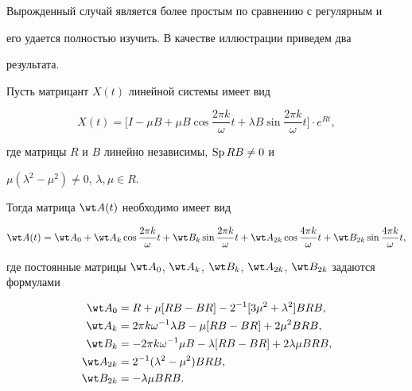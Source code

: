  


Вырожденный случай является более простым по сравнению с регулярным и 


его удается полностью изучить. В качестве иллюстрации приведем два 


результата. 


 


 


\begin{thm} 


Пусть матрицант $X(t)$ линейной системы имеет вид 


$$ 


X(t)=\bigg[I-\mu B+\mu B\cos\frac{2\pi k}{\omega}t+ 


\lambda B\sin\frac{2\pi k}{\omega}t\bigg]\cdot e^{Rt}, 


$$ 


где матрицы $R$ и $B$ линейно независимы, $\operatorname{Sp} RB\ne0$ и 


$\mu(\lambda^2-\mu^2)\ne0$, $\lambda,\mu\in R$. 


Тогда матрица $\wt A(t)$ необходимо имеет вид 


$$ 


\wt A(t)=\wt A_0+\wt A_k\cos\frac{2\pi k}{\omega}t+ 


\wt B_k\sin\frac{2\pi k}{\omega}t+ 


\wt A_{2k}\cos\frac{4\pi k}{\omega}t+\wt B_{2k} 


\sin\frac{4\pi k}{\omega}t, 


$$ 


где постоянные матрицы $\wt A_0$, $\wt A_k$, $\wt B_k$, $\wt A_{2k}$, $\wt 


B_{2k}$ задаются формулами 


\begin{align*} 


\wt A_0&=R+\mu[RB-BR]-2^{-1}[3\mu^2+\lambda^2]BRB, \\ 


\wt A_k&=2\pi k\omega^{-1}\lambda B-\mu[RB-BR] 


+2\mu^2BRB, \\ 


\wt B_k&=-2\pi k\omega^{-1}\mu B -\lambda[RB-BR]+ 


2\lambda\mu BRB, \\ 


\wt A_{2k}&=2^{-1}(\lambda^2-\mu^2)BRB, \\ 


\wt B_{2k}&=-\lambda\mu BRB. 



\end{align*}
\end{thm}
